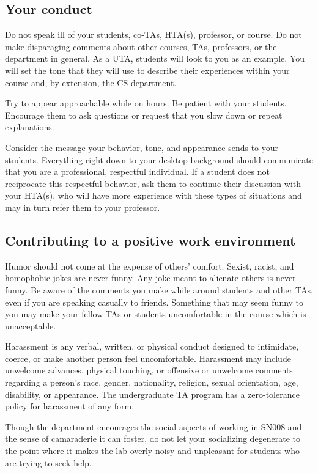 \documentclass[a4paper]{article}
\begin{document}
\subsection{Your conduct}
Do not speak ill of your students, co-TAs, HTA(s), professor, or course. Do not make
disparaging comments about other courses, TAs, professors, or the department in general.
As a UTA, students will look to you as an example. You will set the tone that they will use to
describe their experiences within your course and, by extension, the CS department.
\begin{flushleft}
Try to appear approachable while on hours. Be patient with your students. Encourage them
to ask questions or request that you slow down or repeat explanations.
\end{flushleft}
\begin{flushleft}
Consider the message your behavior, tone, and appearance sends to your students.
Everything right down to your desktop background should communicate that you are a
professional, respectful individual. If a student does not reciprocate this respectful behavior,
ask them to continue their discussion with your HTA(s), who will have more experience
with these types of situations and may in turn refer them to your professor. 
\end{flushleft}
\subsection{Contributing to a positive work environment}
Humor should not come at the expense of others’ comfort. Sexist, racist, and homophobic
jokes are never funny. Any joke meant to alienate others is never funny. Be aware of the
comments you make while around students and other TAs, even if you are speaking casually
to friends. Something that may seem funny to you may make your fellow TAs or students
uncomfortable in the course which is unacceptable.
\begin{flushleft}
Harassment is any verbal, written, or physical conduct designed to intimidate, coerce, or
make another person feel uncomfortable. Harassment may include unwelcome advances,
physical touching, or offensive or unwelcome comments regarding a person’s race, gender,
nationality, religion, sexual orientation, age, disability, or appearance. The undergraduate TA
program has a zero-tolerance policy for harassment of any form.
\end{flushleft}
\begin{flushleft}
Though the department encourages the social aspects of working in SN008 and the sense
of camaraderie it can foster, do not let your socializing degenerate to the point where it
makes the lab overly noisy and unpleasant for students who are trying to seek help. 
\end{flushleft}
\end{document}
